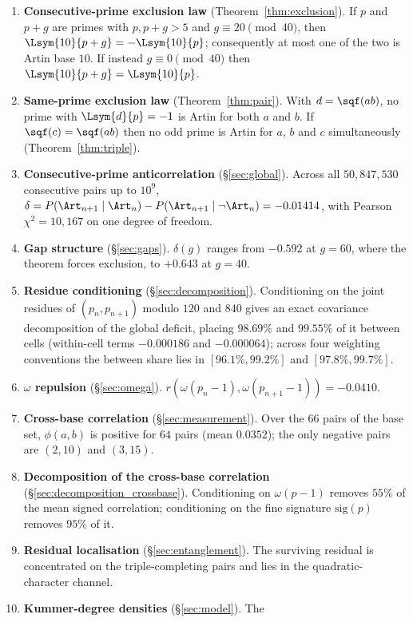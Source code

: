 \begin{enumerate}
	\item \textbf{Consecutive-prime exclusion law} (Theorem~\ref{thm:exclusion}). If $p$ and
	$p+g$ are primes with $p,p+g>5$ and $g\equiv 20 \pmod{40}$, then
	$\Lsym{10}{p+g}=-\Lsym{10}{p}$; consequently at most one of the two is Artin base $10$.
	If instead $g\equiv 0 \pmod{40}$ then $\Lsym{10}{p+g}=\Lsym{10}{p}$.
	\item \textbf{Same-prime exclusion law} (Theorem~\ref{thm:pair}). With $d=\sqf(ab)$, no
	prime with $\Lsym{d}{p}=-1$ is Artin for both $a$ and $b$. If $\sqf(c)=\sqf(ab)$ then no
	odd prime is Artin for $a$, $b$ and $c$ simultaneously (Theorem~\ref{thm:triple}).
	\item \textbf{Consecutive-prime anticorrelation} (\S\ref{sec:global}). Across all
	$50{,}847{,}530$ consecutive pairs up to $10^9$,
	$\delta = P(\Art_{n+1}\mid\Art_n)-P(\Art_{n+1}\mid\lnot\Art_n) = -0.01414$, with
	Pearson $\chi^2 = 10{,}167$ on one degree of freedom.
	\item \textbf{Gap structure} (\S\ref{sec:gaps}). $\delta(g)$ ranges from $-0.592$ at
	$g=60$, where the theorem forces exclusion, to $+0.643$ at $g=40$.
	\item \textbf{Residue conditioning} (\S\ref{sec:decomposition}). Conditioning on the
	joint residues of $(p_n,p_{n+1})$ modulo $120$ and $840$ gives an exact covariance
	decomposition of the global deficit, placing $98.69\%$ and $99.55\%$ of it between cells
	(within-cell terms $-0.000186$ and $-0.000064$); across four weighting conventions the
	between share lies in $[96.1\%,99.2\%]$ and $[97.8\%,99.7\%]$.
	\item \textbf{$\omega$ repulsion} (\S\ref{sec:omega}).
	$r(\omega(p_n-1),\omega(p_{n+1}-1)) = -0.0410$.
	\item \textbf{Cross-base correlation} (\S\ref{sec:measurement}). Over the $66$ pairs of
	the base set, $\phi(a,b)$ is positive for $64$ pairs (mean $0.0352$); the only negative
	pairs are $(2,10)$ and $(3,15)$.
	\item \textbf{Decomposition of the cross-base correlation} (\S\ref{sec:decomposition_crossbase}).
	Conditioning on $\omega(p-1)$ removes $55\%$ of the mean signed correlation; conditioning
	on the fine signature $\mathrm{sig}(p)$ removes $95\%$ of it.
	\item \textbf{Residual localisation} (\S\ref{sec:entanglement}). The surviving residual
	is concentrated on the triple-completing pairs and lies in the quadratic-character
	channel.
	\item \textbf{Kummer-degree densities} (\S\ref{sec:model}). The

\end{enumerate}
